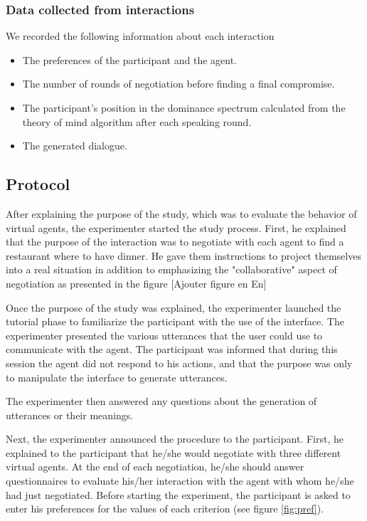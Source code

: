 \documentclass[10pt, a4paper, twocolumn]{article} %
\begin{document}
	
	\subsubsection{Data collected from interactions}
	We recorded the following information about each interaction
	\begin{itemize}
		\item The preferences of the participant and the agent.
		\item The number of rounds of negotiation before finding a final compromise.
		\item The participant's position in the dominance spectrum calculated from the theory of mind algorithm after each speaking round.
		\item The generated dialogue.
		
	\end{itemize}
		
		
		\subsection{Protocol}
		After explaining the purpose of the study, which was to evaluate the behavior of virtual agents, the experimenter started the study process. 
		First, he explained that the purpose of the interaction was to negotiate with each agent to find a restaurant where to have dinner. He gave them instructions to project themselves into a real situation in addition to emphasizing the "collaborative" aspect of negotiation as presented in the figure %
		[Ajouter figure en En]
		
		
		Once the purpose of the study was explained, the experimenter launched the tutorial phase to familiarize the participant with the use of the interface. The experimenter presented the various utterances that the user could use to communicate with the agent. 	
		The participant was informed that during this session the agent did not respond to his actions, and that the purpose was only to manipulate the interface to generate utterances. 
		
		The experimenter then answered any questions about the generation of utterances or their meanings.
		
		Next, the experimenter announced the procedure to the participant. First, he explained to the participant that he/she would negotiate with three different virtual agents. At the end of each negotiation, he/she should answer  questionnaires to evaluate his/her interaction with the agent with whom he/she had just negotiated.
		Before starting the experiment, the participant is asked to enter his preferences for the values of each criterion (see figure \ref{fig:pref}).
		
\end{document}
